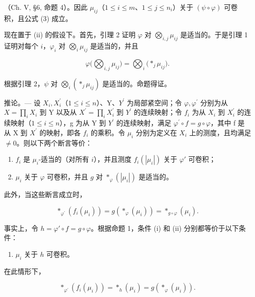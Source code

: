 （Ch. V, §6, 命题 4）。因此 \(\mu_{ij}\)（\(1 \leqslant i \leqslant m\)、\(1 \leqslant j \leqslant n_i\)）关于 \((\psi \circ \varphi)\) 可卷积，且公式 (3) 成立。

现在置于 (ii) 的假设下。首先，引理 2 证明 \(\varphi\) 对 \(\bigotimes_{i,j} \mu_{ij}\) 是适当的。于是引理 1 证明对每个 \(i\)，\(\varphi_i\) 对 \(\bigotimes_{i} \mu_{ij}\) 是适当的，并且

\[
\varphi \Big (\bigotimes_ {i, j} \mu_ {i j} \Big) = \bigotimes_ {i} \Big (* _ {j} \mu_ {i j} \Big).
\]

根据引理 2，\(\psi\) 对 \(\bigotimes_{i}\left(*_{j}\mu_{ij}\right)\) 是适当的。命题得证。

推论。--- 设 \(X_{i}, X_{i}^{\prime}\)（\(1 \leqslant i \leqslant n\)）、Y、\(Y^{\prime}\) 为局部紧空间；令 \(\varphi, \varphi^{\prime}\) 分别为从 \(X = \prod_{i} X_{i}\) 到 Y 以及从 \(X^{\prime} = \prod_{i} X_{i}^{\prime}\) 到 \(Y^{\prime}\) 的连续映射；令 \(f_{i}\) 为从 \(X_{i}\) 到 \(X_{i}^{\prime}\) 的连续映射（\(1 \leqslant i \leqslant n\)），g 为从 Y 到 \(Y^{\prime}\) 的连续映射，满足 \(\varphi^{\prime} \circ f = g \circ \varphi\)，其中 f 是从 X 到 \(X^{\prime}\) 的映射，即各 \(f_{i}\) 的乘积。令 \(\mu_{i}\) 分别为定义在 \(X_{i}\) 上的测度，且均满足 \(\neq 0\)。则以下两个断言等价：

\begin{enumerate}
\def\labelenumi{(\roman{enumi})}
\item
  \(f_{i}\) 是 \(\mu_{i}\)-适当的（对所有 \(i\)），并且测度 \(f_{i}(|\mu_{i}|)\) 关于 \(\varphi'\) 可卷积；
\item
  \(\mu_{i}\) 关于 \(\varphi\) 可卷积，并且 \(g\) 对 \(*_{\varphi}(|\mu_i|)\) 是适当的。
\end{enumerate}

此外，当这些断言成立时，

\[
\left. \ast_ {\varphi^ {\prime}} \left(f _ {i} \left(\mu_ {i}\right)\right) = g \left(\ast_ {\varphi} \left(\mu_ {i}\right)\right) = \ast_ {g \circ \varphi} \left(\mu_ {i}\right). \right.\tag{4}
\]

事实上，令 \(h = \varphi' \circ f = g \circ \varphi\)。根据命题 1，条件 (i) 和 (ii) 分别都等价于以下条件：

\begin{enumerate}
\def\labelenumi{(\roman{enumi})}
\setcounter{enumi}{2}
\tightlist
\item
  \(\mu_{i}\) 关于 \(h\) 可卷积。
\end{enumerate}

在此情形下，

\[
\left. \ast_ {\varphi^ {\prime}} \left(f _ {i} \left(\mu_ {i}\right)\right) = \ast_ {h} \left(\mu_ {i}\right) = g \left(\ast_ {\varphi} \left(\mu_ {i}\right)\right). \right.
\]

